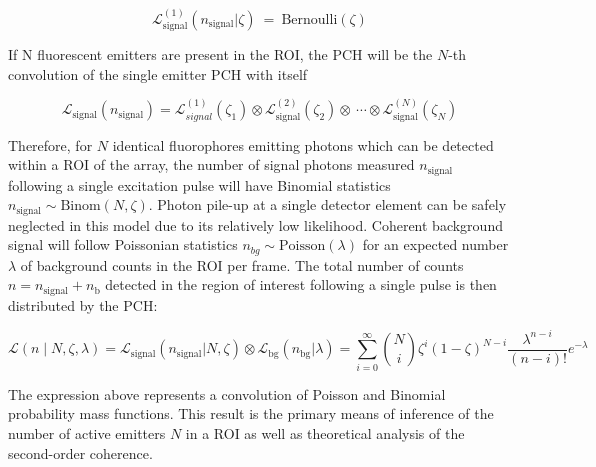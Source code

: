 \begin{equation}
\mathcal{L}_{\mathrm{signal}}^{(1)}(n_{\mathrm{signal}}\lvert\zeta)\ =\ \mathrm{Bernoulli}(\zeta)
\end{equation}

If N fluorescent emitters are present in the ROI, the PCH will be the $N$-th convolution of the single emitter PCH with itself \parencite{Chen1999}

\begin{equation}
\mathcal{L}_{\mathrm{signal}}(n_{\mathrm{signal}})=\mathcal{L}_{signal}^{(1)}(\zeta_1)\otimes\mathcal{L}_{\mathrm{signal}}^{(2)}(\zeta_2)\otimes\ \cdots\otimes\mathcal{L}_{\mathrm{signal}}^{(N)}(\zeta_N)
\end{equation}

Therefore, for $N$ identical fluorophores emitting photons which can be detected within a ROI of the array, the number of signal photons measured $n_{\mathrm{signal}}$ following a single excitation pulse will have Binomial statistics $n_{\mathrm{signal}}\sim \mathrm{Binom}\left(N,\zeta\right)$. Photon pile-up at a single detector element can be safely neglected in this model due to its relatively low likelihood. Coherent background signal will follow Poissonian statistics $n_{bg}\sim\mathrm{Poisson}\left(\lambda\right)$ for an expected number $\lambda$ of background counts in the ROI per frame. The total number of counts $n=n_{\mathrm{signal}}+n_{\mathrm{b}}$ detected in the region of interest following a single pulse is then distributed by the PCH:

\begin{equation}
\mathcal{L}\left(n\mid N,\zeta,\lambda\right)=\mathcal{L}_{\mathrm{signal}}(n_{\mathrm{signal}}\lvert N,\zeta)\otimes\mathcal{L}_{\mathrm{bg}}(n_{\mathrm{bg}}\lvert \lambda)=\sum_{i=0}^{\infty}\binom{N}{i}\zeta^i\left(1-\zeta\right)^{N-i}\frac{\lambda^{n-i}}{\left(n-i\right)!}e^{-\lambda} 
\end{equation}

The expression above represents a convolution of Poisson and Binomial probability mass functions. This result is the primary means of inference of the number of active emitters $N$ in a ROI as well as theoretical analysis of the second-order coherence. 





